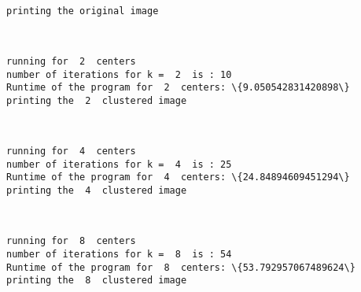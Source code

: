 \documentclass[11pt]{article}
\begin{document}
    \begin{center}
    \end{center}
    { \hspace*{\fill} \\}
    
    \begin{Verbatim}[commandchars=\\\{\}]
printing the original image
    \end{Verbatim}

    \begin{center}
    \end{center}
    { \hspace*{\fill} \\}
    
    \begin{Verbatim}[commandchars=\\\{\}]
running for  2  centers
number of iterations for k =  2  is : 10
Runtime of the program for  2  centers: \{9.050542831420898\}
printing the  2  clustered image
    \end{Verbatim}

    \begin{center}
    \end{center}
    { \hspace*{\fill} \\}
    
    \begin{Verbatim}[commandchars=\\\{\}]
running for  4  centers
number of iterations for k =  4  is : 25
Runtime of the program for  4  centers: \{24.84894609451294\}
printing the  4  clustered image
    \end{Verbatim}

    \begin{center}
    \end{center}
    { \hspace*{\fill} \\}
    
    \begin{Verbatim}[commandchars=\\\{\}]
running for  8  centers
number of iterations for k =  8  is : 54
Runtime of the program for  8  centers: \{53.792957067489624\}
printing the  8  clustered image
    \end{Verbatim}
\end{document}

